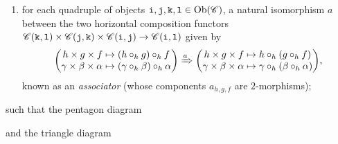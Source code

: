 \begin{definition}
\begin{enumerate}[label=$\bullet$, leftmargin=4\parindent]
\item for each quadruple of objects $\textnormal{\texttt{i}}, \textnormal{\texttt{j}}, \textnormal{\texttt{k}}, \textnormal{\texttt{l}} \in \textnormal{Ob}(\mathscr{C})$, a natural isomorphism $a$ between the two horizontal composition functors $\mathscr{C}(\textnormal{\texttt{k}}, \textnormal{\texttt{l}}) \times \mathscr{C}(\textnormal{\texttt{j}}, \textnormal{\texttt{k}}) \times \mathscr{C}(\textnormal{\texttt{i}}, \textnormal{\texttt{j}}) \to \mathscr{C}(\textnormal{\texttt{i}}, \textnormal{\texttt{l}})$ given by
\begin{align*}
\begin{split}
\begin{pmatrix}h \times g \times f \mapsto (h \circ_h g) \circ_h f\\\gamma \times \beta \times \alpha \mapsto (\gamma \circ_h \beta) \circ_h \alpha\end{pmatrix} \xRightarrow{a} \begin{pmatrix}h \times g \times f \mapsto h \circ_h (g \circ_h f)\\\gamma \times \beta \times \alpha \mapsto \gamma \circ_h (\beta \circ_h \alpha)\end{pmatrix}\!,
\end{split}
\end{align*}
known as an {\em associator} (whose components $a_{h, g, f}$ are $2$-morphisms);
\end{enumerate}
\noindent such that the pentagon diagram
\begin{center}
\end{center}
\noindent and the triangle diagram
\begin{center}

\end{center}
\end{definition}
